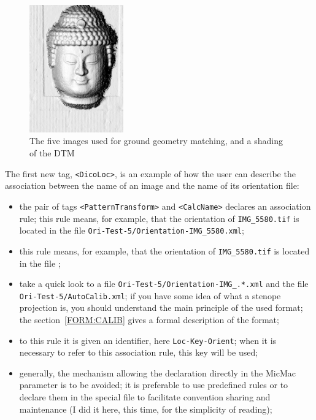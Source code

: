 \begin{figure}
\begin{center}
\includegraphics[height=55mm]{FIGS/Boudhas/Terrain-Shade.jpg}
\caption{The five images used for ground geometry matching, and a shading of the DTM}
\label{FIVEBOUDHA}
\end{center}
\end{figure}

The first new tag, {\tt <DicoLoc>}, is an example of how the user can
describe the association between the name of an image and the name
of its orientation file:

\begin{itemize}
   \item  the pair of tags {\tt  <PatternTransform>} and {\tt <CalcName>} declares an
          association rule; this rule means, for example, that the orientation of {\tt IMG\_5580.tif}
          is located in the file \newline
          {\tt Ori-Test-5/Orientation-IMG\_5580.xml};

    \item this rule means, for example,  that the orientation of  {\tt IMG\_5580.tif}
          is located in the file ;
    \item take a quick look to a file {\tt Ori-Test-5/Orientation-IMG\_.*.xml} and
         the file  {\tt Ori-Test-5/AutoCalib.xml}; if you have some idea of what
         a stenope projection is, you should understand the main principle of the used format;
         the section~\ref{FORM:CALIB} gives a formal description of the format;

    \item  to this rule it is given an identifier, here {\tt Loc-Key-Orient}; when it is necessary
        to refer to this association rule, this key will be used;

    \item  generally, the mechanism allowing the declaration directly in the MicMac
           parameter is to be avoided; it is preferable to use predefined rules or to declare
           them in the special file  to
           facilitate convention sharing and maintenance
           (I did it here, this time, for the simplicity of reading);
\end{itemize}

